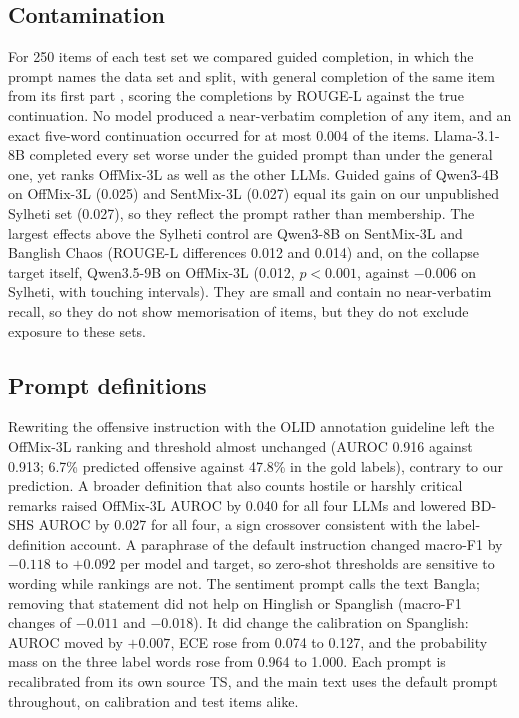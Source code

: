 \subsection{Contamination}
\label{sec:appendix-contamination}
For 250 items of each test set we compared guided completion, in which the prompt names the data set and split, with
general completion of the same item from its first part \citep{golchin2024time}, scoring the completions by ROUGE-L
against the true continuation. No model produced a near-verbatim completion of any
item, and an exact five-word continuation occurred for at most 0.004 of the items. Llama-3.1-8B completed every set
worse under the guided prompt than under the general one, yet ranks OffMix-3L as well as the other LLMs. Guided gains of
Qwen3-4B on OffMix-3L (0.025) and SentMix-3L (0.027) equal its gain on our unpublished Sylheti set (0.027), so they
reflect the prompt rather than membership. The largest effects above the Sylheti control are Qwen3-8B on SentMix-3L and
Banglish Chaos (ROUGE-L differences 0.012 and 0.014) and, on the collapse target itself, Qwen3.5-9B on OffMix-3L (0.012,
$p < 0.001$, against $-0.006$ on Sylheti, with touching intervals). They are small and contain no near-verbatim recall, so they
do not show memorisation of items, but they do not exclude exposure to these sets.

\subsection{Prompt definitions}
\label{sec:appendix-prompts}
Rewriting the offensive instruction with the OLID annotation guideline left the OffMix-3L ranking and threshold almost
unchanged (AUROC 0.916 against 0.913; 6.7\% predicted offensive against 47.8\% in the gold labels), contrary to our
prediction. A broader definition that also counts hostile or harshly critical remarks raised OffMix-3L AUROC by 0.040 for
all four LLMs and lowered BD-SHS AUROC by 0.027 for all four, a sign crossover consistent with the label-definition
account. A paraphrase of the default instruction changed macro-F1 by $-0.118$ to $+0.092$ per model and target, so
zero-shot thresholds are sensitive to wording while rankings are not. The sentiment prompt calls the text Bangla;
removing that statement did not help on Hinglish or Spanglish (macro-F1 changes of $-0.011$ and $-0.018$). It did
change the calibration on Spanglish: AUROC moved by $+0.007$, ECE rose from 0.074 to 0.127, and the probability mass on
the three label words rose from 0.964 to 1.000. Each prompt is recalibrated from its own source TS, and the main text
uses the default prompt throughout, on calibration and test items alike.


